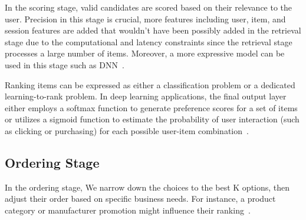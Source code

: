 In the scoring stage, valid candidates are scored based on their relevance to the user. Precision in this stage is crucial, more features including user, item, and session features are added that wouldn't have been possibly added in the retrieval stage due to the computational and latency constraints since the retrieval stage processes a large number of items. Moreover, a more expressive model can be used in this stage such as DNN~\cite{eugeneyan}. 

Ranking items can be expressed as either a classification problem or a dedicated learning-to-rank problem. In deep learning applications, the final output layer either employs a softmax function to generate preference scores for a set of items or utilizes a sigmoid function to estimate the probability of user interaction (such as clicking or purchasing) for each possible user-item combination~\cite{eugeneyan}. 

\subsection{Ordering Stage}
In the ordering stage, We narrow down the choices to the best K options, then adjust their order based on specific business needs. For instance, a product category or manufacturer promotion might influence their ranking~\cite{NvidiaRecSysBestPractices}.
